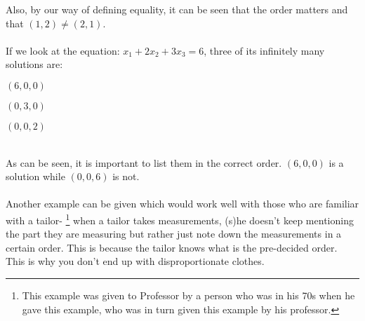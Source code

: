 Also, by our way of defining equality, it can be seen that the order matters and that $(1, 2) \neq (2, 1)$.\\~\\
If we look at the equation: $x_1 + 2x_2 + 3x_3 = 6$, three of its infinitely many solutions are:
\begin{enumerate*}[label=(\roman*)]
    \item $(6, 0, 0)$
    \item $(0, 3, 0)$
    \item $(0, 0, 2)$
\end{enumerate*}\\
As can be seen, it is important to list them in the correct order. $(6, 0, 0)$ is a solution while $(0, 0, 6)$ is not.\\~\\
Another example can be given which would work well with those who are familiar with a tailor-%
\footnote{This example was given to Professor by a person who was in his 70s when he gave this example, who was in turn given this example by his professor.}%
when a tailor takes measurements, (s)he doesn't keep mentioning the part they are measuring but rather just note down the measurements in a certain order. This is because the tailor knows what is the pre-decided order. This is why you don't end up with disproportionate clothes.
